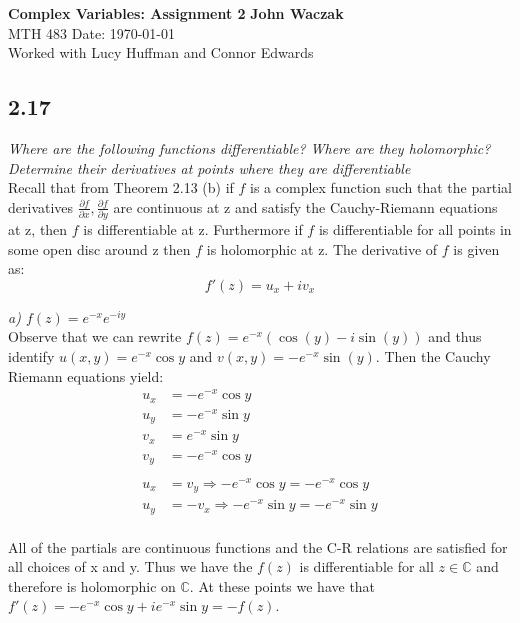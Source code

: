 \documentclass[a4paper, 11pt]{article}
\begin{document}
\noindent
\large\textbf{Complex Variables: Assignment 2} \hfill \textbf{John Waczak} \\
\normalsize MTH 483 \hfill  Date: \today \\
Worked with Lucy Huffman and Connor Edwards 

\subsection*{2.17}
	\textit{Where are the following functions differentiable? Where are they holomorphic? Determine their derivatives at points where they are differentiable} \\ 
	
	\noindent Recall that from Theorem 2.13 (b) if $f$ is a complex function such that the partial derivatives $\frac{\partial f}{\partial x}, \frac{\partial f}{\partial y}$ are continuous at z and satisfy the Cauchy-Riemann equations at z, then $f$ is differentiable at z. Furthermore if $f$ is differentiable for all points in some open disc around z then $f$ is holomorphic at z. The derivative of $f$ is given as:\\ 
		\begin{equation*}
			f'(z) = u_x+iv_x
		\end{equation*}
		
	\noindent \textit{a) $f(z)=e^{-x}e^{-iy}$} \\ 
	
	\noindent Observe that we can rewrite $f(z) = e^{-x}(\cos(y)-i\sin(y))$ and thus identify $u(x,y) = e^{-x}\cos y$ and $v(x,y) = -e^{-x}\sin(y)$. Then the Cauchy Riemann equations yield: 
		\begin{align*}
			u_x &= -e^{-x}\cos y \\ 
			u_y &= -e^{-x}\sin y \\ 
			v_x &= e^{-x}\sin y \\ 
			v_y &= -e^{-x}\cos y \\ 
			&\quad\\ 
			u_x &= v_y \Rightarrow -e^{-x}\cos y = -e^{-x}\cos y  \\ 
			u_y &= -v_x \Rightarrow -e^{-x}\sin y = -e^{-x}\sin y  \\ 
		\end{align*}
	
	\noindent All of the partials are continuous functions and the C-R relations are satisfied for all choices of x and y. Thus we have the $f(z)$ is differentiable for all $z\in\mathbb{C}$ and therefore is holomorphic on $\mathbb{C}$. At these points we have that $f'(z)= -e^{-x}\cos y +ie^{-x}\sin y = -f(z)$.\\
	
\end{document}
